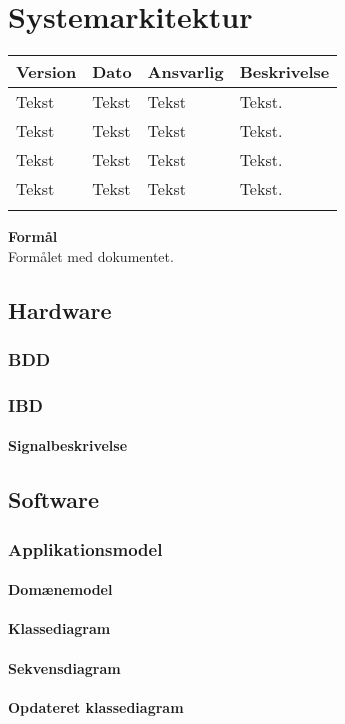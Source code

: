 \chapter{Systemarkitektur}\label{kapitel_Systemark}

\begin{longtabu} to 
    Version &    Dato &    Ansvarlig &    Beskrivelse\\[-1ex]
    \midrule
    Tekst &    Tekst &    Tekst &    Tekst.\\
    Tekst &    Tekst &    Tekst &    Tekst.\\
    Tekst &    Tekst &    Tekst &    Tekst.\\
    Tekst &    Tekst &    Tekst &    Tekst.\\
\label{version_Systemark}
\end{longtabu}

\textbf{Formål}\\
Formålet med dokumentet.

\section{Hardware}
\subsection{BDD}
\subsection{IBD}
\subsubsection{Signalbeskrivelse}

\section{Software}
\subsection{Applikationsmodel}
\subsubsection{Domænemodel}
\subsubsection{Klassediagram}
\subsubsection{Sekvensdiagram}
\subsubsection{Opdateret klassediagram}